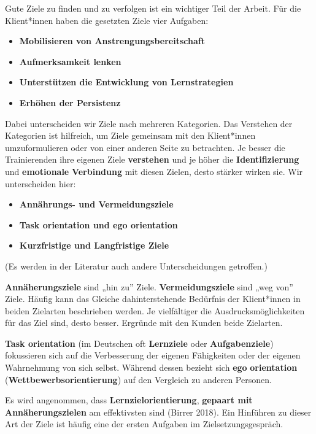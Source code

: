 \documentclass[
  letterpaper,
  DIV=11,
  numbers=noendperiod]{scrreprt}
\providecommand{\tightlist}{%
  \setlength{\itemsep}{0pt}\setlength{\parskip}{0pt}}
\begin{document}
Gute Ziele zu finden und zu verfolgen ist ein wichtiger Teil der Arbeit.
Für die Klient*innen haben die gesetzten Ziele vier Aufgaben:

\begin{itemize}
\tightlist
\item
  \textbf{Mobilisieren von Anstrengungsbereitschaft}
\item
  \textbf{Aufmerksamkeit lenken}
\item
  \textbf{Unterstützen die Entwicklung von Lernstrategien}
\item
  \textbf{Erhöhen der Persistenz}
\end{itemize}

Dabei unterscheiden wir Ziele nach mehreren Kategorien. Das Verstehen
der Kategorien ist hilfreich, um Ziele gemeinsam mit den Klient*innen
umzuformulieren oder von einer anderen Seite zu betrachten. Je besser
die Trainierenden ihre eigenen Ziele \textbf{verstehen} und je höher die
\textbf{Identifizierung} und \textbf{emotionale} \textbf{Verbindung} mit
diesen Zielen, desto stärker wirken sie. Wir unterscheiden hier:

\begin{itemize}
\tightlist
\item
  \textbf{Annährungs- und Vermeidungsziele}
\item
  \textbf{Task orientation und ego orientation}
\item
  \textbf{Kurzfristige und Langfristige Ziele}
\end{itemize}

(Es werden in der Literatur auch andere Unterscheidungen getroffen.)

\textbf{Annäherungsziele} sind „hin zu'' Ziele.
\textbf{Vermeidungsziele} sind „weg von'' Ziele. Häufig kann das Gleiche
dahinterstehende Bedürfnis der Klient*innen in beiden Zielarten
beschrieben werden. Je vielfältiger die Ausdrucksmöglichkeiten für das
Ziel sind, desto besser. Ergründe mit den Kunden beide Zielarten.

\textbf{Task orientation} (im Deutschen oft \textbf{Lernziele} oder
\textbf{Aufgabenziele}) fokussieren sich auf die Verbesserung der
eigenen Fähigkeiten oder der eigenen Wahrnehmung von sich selbst.
Während dessen bezieht sich \textbf{ego} \textbf{orientation}
(\textbf{Wettbewerbsorientierung}) auf den Vergleich zu anderen
Personen.

Es wird angenommen, dass \textbf{Lernzielorientierung}, \textbf{gepaart
mit Annäherungszielen} am effektivsten sind (Birrer 2018). Ein Hinführen
zu dieser Art der Ziele ist häufig eine der ersten Aufgaben im
Zielsetzungsgespräch.
\end{document}
